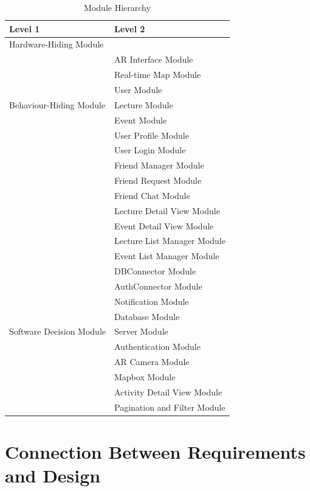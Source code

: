 \documentclass[12pt, titlepage]{article}
\begin{document}
  
  \begin{table}[H]
  \centering
  \begin{tabular}{p{} p{}}
  \toprule
  \textbf{Level 1} & \textbf{Level 2}\\
  \midrule
  
  {Hardware-Hiding Module} & ~ \\
  \midrule
  
  \multirow{7}{0.3\textwidth}{Behaviour-Hiding Module}
  & AR Interface Module\\
  & Real-time Map Module\\
  & User Module\\
  & Lecture Module\\
  & Event Module\\
  & User Profile Module\\
  & User Login Module\\
  & Friend Manager Module\\ 
  & Friend Request Module\\
  & Friend Chat Module\\
  & Lecture Detail View Module\\
  & Event Detail View Module\\
  & Lecture List Manager Module\\
  & Event List Manager Module\\
  & DBConnector Module\\
  & AuthConnector Module\\
  & Notification Module\\
  \midrule
  
  \multirow{3}{0.3\textwidth}{Software Decision Module}
  & Database Module\\
  & Server Module\\
  & Authentication Module\\
  & AR Camera Module\\
  & Mapbox Module\\
  & Activity Detail View Module\\
  & Pagination and Filter Module\\
  \bottomrule
  
  \end{tabular}
  \caption{Module Hierarchy}
  \label{TblMH}
  \end{table}
  
  \section{Connection Between Requirements and Design} \label{SecConnection}
  
\end{document}
